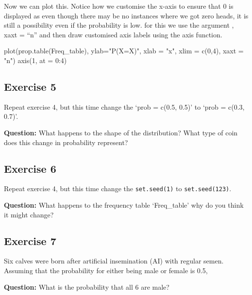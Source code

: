 \documentclass[
  10pt,
  letterpaper,
  DIV=11,
  numbers=noendperiod]{scrartcl}
\newenvironment{Shaded}{\begin{snugshade}}{\end{snugshade}}
\newcommand{\AttributeTok}[1]{\textcolor[rgb]{0.40,0.45,0.13}{#1}}
\newcommand{\DecValTok}[1]{\textcolor[rgb]{0.68,0.00,0.00}{#1}}
\newcommand{\FunctionTok}[1]{\textcolor[rgb]{0.28,0.35,0.67}{#1}}
\newcommand{\NormalTok}[1]{\textcolor[rgb]{0.00,0.23,0.31}{#1}}
\newcommand{\SpecialCharTok}[1]{\textcolor[rgb]{0.37,0.37,0.37}{#1}}
\newcommand{\StringTok}[1]{\textcolor[rgb]{0.13,0.47,0.30}{#1}}
\begin{document}
Now we can plot this. Notice how we customise the x-axis to ensure that
0 is displayed as even though there may be no instances where we got
zero heads, it is still a possibility even if the probability is low.
for this we use the argument , xaxt = ``n'' and then draw customised
axis labels using the axis function.

\begin{Shaded}
\begin{Highlighting}[]
\FunctionTok{plot}\NormalTok{(}\FunctionTok{prop.table}\NormalTok{(Freq\_table), }\AttributeTok{ylab=}\StringTok{"P(X=X)"}\NormalTok{, }\AttributeTok{xlab =} \StringTok{"x"}\NormalTok{, }\AttributeTok{xlim =} \FunctionTok{c}\NormalTok{(}\DecValTok{0}\NormalTok{,}\DecValTok{4}\NormalTok{), }\AttributeTok{xaxt =} \StringTok{"n"}\NormalTok{)}
\FunctionTok{axis}\NormalTok{(}\DecValTok{1}\NormalTok{, }\AttributeTok{at =} \DecValTok{0}\SpecialCharTok{:}\DecValTok{4}\NormalTok{)}
\end{Highlighting}
\end{Shaded}

\subsection{Exercise 5}\label{exercise-5}

Repeat exercise 4, but this time change the `prob = c(0.5, 0.5)' to
`prob = c(0.3, 0.7)'.

\textbf{Question:} What happens to the shape of the distribution? What
type of coin does this change in probability represent?

\subsection{Exercise 6}\label{exercise-6}

Repeat exercise 4, but this time change the \texttt{set.seed(1)} to
\texttt{set.seed(123)}.

\textbf{Question:} What happens to the frequency table `Freq\_table' why
do you think it might change?

\subsection{Exercise 7}\label{exercise-7}

Six calves were born after artificial insemination (AI) with regular
semen. Assuming that the probability for either being male or female is
0.5,

\textbf{Question:} What is the probability that all 6 are male?\\
\end{document}
